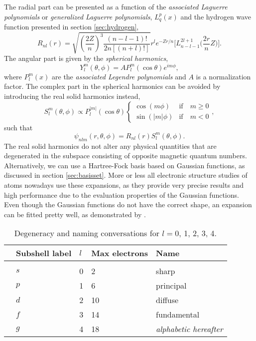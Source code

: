 The radial part can be presented as a function of the \textit{associated Laguerre polynomials} or \textit{generalized Laguerre polynomials}, $L_{q}^p(x)$ and the hydrogen wave function presented in section \ref{sec:hydrogen},
\begin{equation}
R_{nl}(r)=\sqrt{\left(\frac{2Z}{n}\right)^3\frac{(n-l-1)!}{2n[(n+l)!]}} r^le^{-Zr/n}\Big[L_{n-l-1}^{2l+1}\Big(\frac{2r}{n}Z\Big)\Big].
\end{equation}
The angular part is given by the \textit{spherical harmonics},
\begin{equation}
Y_l^m(\theta,\phi)=A P_l^m(\cos\theta)e^{im\phi},
\end{equation}
where $P_l^m(x)$ are the \textit{associated Legendre polynomials} and $A$ is a normalization factor. The complex part in the spherical harmonics can be avoided by introducing the real solid harmonics instead,
\begin{equation}
\label{eq:V_ext}
S_l^m(\theta,\phi)\propto P_l^{|m|}(\cos\theta)
\begin{cases} 
\cos(m\phi) & \text{if} \quad m\geq0 \\
\sin(|m|\phi) & \text{if} \quad m<0
\end{cases},
\end{equation}
such that
\begin{equation}
\psi_{nlm}(r,\theta,\phi)= R_{nl}(r)S_l^m(\theta,\phi).
\label{eq:hydrogenlikesolid}
\end{equation}
The real solid harmonics do not alter any physical quantities that are degenerated in the subspace consisting of opposite magnetic quantum numbers. Alternatively, we can use a Hartree-Fock basis based on Gaussian functions, as discussed in section \ref{sec:basisset}. More or less all electronic structure studies of atoms nowadays use these expansions, as they provide very precise results and high performance due to the evaluation properties of the Gaussian functions. Even though the Gaussian functions do not have the correct shape, an expansion can be fitted pretty well, as demonstrated by \citet{hehre_selfconsistent_1969}.

\begin{table}
	\caption{Degeneracy and naming conversations for $l=0$, 1, 2, 3, 4.  \vspace{2mm}}
	\begin{tabularx}{\textwidth}{R{0.3cm}XXXX} \hline\hline
		\label{tab:subshells}
		\makecell{\phantom{=}} & Subshell label & $l$ & Max electrons & Name \\ \hline \\
		& $s$ & 0 & 2 & sharp\\ 
		& $p$ & 1 & 6 & principal\\
		& $d$ & 2 & 10 & diffuse \\
		& $f$ & 3 & 14 & fundamental \\
		& $g$ & 4 & 18 & \textit{alphabetic hereafter} \\ \hline\hline
	\end{tabularx}
\end{table}

